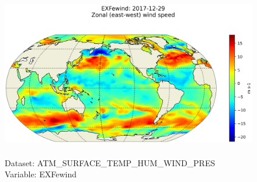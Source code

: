\begin{figure}[H]
\centering
\includegraphics[scale=0.5]{../images/plots/latlon_plots/Atmosphere_Surface_Temperature_Humidity_Wind_and_Pressure/EXFewind.png}
\caption{\\Dataset: ATM\_SURFACE\_TEMP\_HUM\_WIND\_PRES\\Variable: EXFewind}
\label{tab:table-ATM_SURFACE_TEMP_HUM_WIND_PRES_EXFewind-Plot}
\end{figure}
\pagebreak
